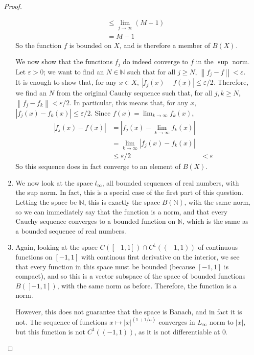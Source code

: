 \documentclass[12pt]{article}
\newcommand{\N}{\mathbb{N}}
\theoremstyle{definition}
\begin{document}
\begin{proof}
\begin{enumerate}[label=(\roman*)]
\begin{align*}
				&\leq \lim_{j \to \infty} (M + 1)\\
				&= M + 1
			\end{align*}
			So the function $f$ is bounded on $X$, and is therefore a member of $B(X)$.
			\par We now show that the functions $f_j$ do indeed converge to $f$ in the $\sup$ norm. Let $\varepsilon > 0$; we want to find an $N \in \N$ such that for all $j \geq N$, $\left \lVert {  f_j - f } \right \lVert < \varepsilon$. It is enough to show that, for any $x \in X$, $\left \lvert { f_j(x) - f(x) } \right \lvert \leq \varepsilon/2$. Therefore, we find an $N$ from the original Cauchy sequence such that, for all $j, k \geq N$, $\left \lVert { f_j - f_k } \right \lVert < \varepsilon/2$. In particular, this means that, for any $x$, $\left \lvert { f_j(x) - f_k(x) } \right \lvert \leq \varepsilon/2$. Since $f(x) = \lim_{k\to \infty} f_k(x)$, 
			\begin{align*}
				\left \lvert { f_j(x) - f(x) } \right \lvert &= \left \lvert { f_j(x) - \lim_{k \to \infty} f_k(x) } \right \lvert \\
				&= \lim_{k \to \infty} \left \lvert { f_j(x) - f_k(x) } \right \lvert \\
				&\leq \varepsilon/2
				&<\varepsilon
			\end{align*}
			So this sequence does in fact converge to an element of $B(X)$.
		\item We now look at the space $l_\infty$, all bounded sequences of real numbers, with the sup norm. In fact, this is a special case of the first part of this question. Letting the space be $\N$, this is exactly the space $B(\N)$, with the same norm, so we can immediately say that the function is a norm, and that every Cauchy sequence converges to a bounded function on $\N$, which is the same as a bounded sequence of real numbers.
		\item Again, looking at the space $C([-1, 1]) \cap C^1( (-1, 1))$ of continuous functions on $[-1,1]$ with continous first derivative on the interior, we see that every function in this space must be bounded (because $[-1,1]$ is compact), and so this is a vector subspace of the space of bounded functions $B([-1,1])$, with the same norm as before. Therefore, the function is a norm.
			\par However, this does not guarantee that the space is Banach, and in fact it is not. The sequence of functions $x \mapsto \left \lvert { x } \right \lvert ^(1 + 1/n)$ converges in $L_\infty$ norm to $\left \lvert { x } \right \lvert $, but this function is not $C^1( (-1, 1))$, as it is not differentiable at $0$.

	\end{enumerate}
\end{proof}
\end{document}

